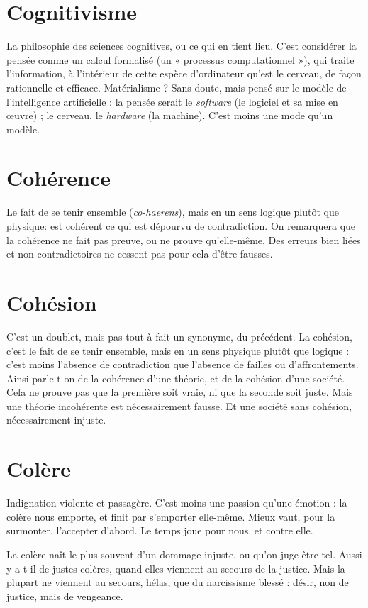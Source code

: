 \section{Cognitivisme}
La philosophie des sciences cognitives, ou ce qui en tient
lieu. C’est considérer la pensée comme un calcul formalisé
(un « processus computationnel »), qui traite l’information, à l’intérieur de
cette espèce d'ordinateur qu'est le cerveau, de façon rationnelle et efficace.
Matérialisme ? Sans doute, mais pensé sur le modèle de l'intelligence
artificielle : la pensée serait le {\it software} (le logiciel et sa mise en œuvre) ; le cerveau,
le {\it hardware} (la machine). C’est moins une mode qu’un modèle.

\section{Cohérence}
Le fait de se tenir ensemble ({\it co-haerens}), mais en un sens
logique plutôt que physique: est cohérent ce qui est
dépourvu de contradiction. On remarquera que la cohérence ne fait pas preuve,
ou ne prouve qu’elle-même. Des erreurs bien liées et non contradictoires ne
cessent pas pour cela d’être fausses.

\section{Cohésion}
C'est un doublet, mais pas tout à fait un synonyme, du précédent.
La cohésion, c’est le fait de se tenir ensemble, mais en un
sens physique plutôt que logique : c’est moins l’absence de contradiction que
l'absence de failles ou d’affrontements. Ainsi parle-t-on de la cohérence d’une
théorie, et de la cohésion d’une société. Cela ne prouve pas que la première soit
vraie, ni que la seconde soit juste. Mais une théorie incohérente est nécessairement
fausse. Et une société sans cohésion, nécessairement injuste.

\section{Colère}
Indignation violente et passagère. C’est moins une passion qu’une
émotion : la colère nous emporte, et finit par s’emporter elle-même.
Mieux vaut, pour la surmonter, l’accepter d’abord. Le temps joue pour
nous, et contre elle.

La colère naît le plus souvent d’un dommage injuste, ou qu’on juge être tel.
Aussi y a-t-il de justes colères, quand elles viennent au secours de la justice.
Mais la plupart ne viennent au secours, hélas, que du narcissisme blessé : désir,
non de justice, mais de vengeance.

